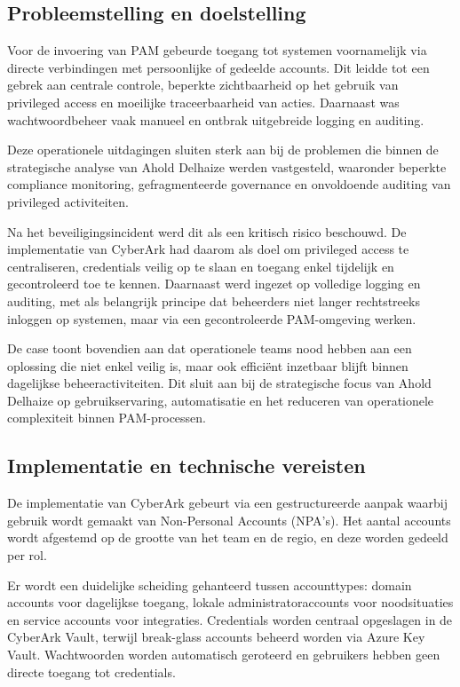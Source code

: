 \subsection{Probleemstelling en doelstelling}
Voor de invoering van PAM gebeurde toegang tot systemen voornamelijk via directe verbindingen met persoonlijke of gedeelde accounts. Dit leidde tot een gebrek aan centrale controle, beperkte zichtbaarheid op het gebruik van privileged access en moeilijke traceerbaarheid van acties. Daarnaast was wachtwoordbeheer vaak manueel en ontbrak uitgebreide logging en auditing. 

Deze operationele uitdagingen sluiten sterk aan bij de problemen die binnen de strategische analyse van Ahold Delhaize werden vastgesteld, waaronder beperkte compliance monitoring, gefragmenteerde governance en onvoldoende auditing van privileged activiteiten.
 
Na het beveiligingsincident werd dit als een kritisch risico beschouwd. De implementatie van CyberArk had daarom als doel om privileged access te centraliseren, credentials veilig op te slaan en toegang enkel tijdelijk en gecontroleerd toe te kennen. Daarnaast werd ingezet op volledige logging en auditing, met als belangrijk principe dat beheerders niet langer rechtstreeks inloggen op systemen, maar via een gecontroleerde PAM-omgeving werken.
 
De case toont bovendien aan dat operationele teams nood hebben aan een oplossing die niet enkel veilig is, maar ook efficiënt inzetbaar blijft binnen dagelijkse beheeractiviteiten. Dit sluit aan bij de strategische focus van Ahold Delhaize op gebruikservaring, automatisatie en het reduceren van operationele complexiteit binnen PAM-processen. 

\subsection{Implementatie en technische vereisten}

De implementatie van CyberArk gebeurt via een gestructureerde aanpak waarbij gebruik wordt gemaakt van Non-Personal Accounts (NPA’s). Het aantal accounts wordt afgestemd op de grootte van het team en de regio, en deze worden gedeeld per rol.
 
Er wordt een duidelijke scheiding gehanteerd tussen accounttypes: domain accounts voor dagelijkse toegang, lokale administratoraccounts voor noodsituaties en service accounts voor integraties. Credentials worden centraal opgeslagen in de CyberArk Vault, terwijl break-glass accounts beheerd worden via Azure Key Vault. Wachtwoorden worden automatisch geroteerd en gebruikers hebben geen directe toegang tot credentials.
 
